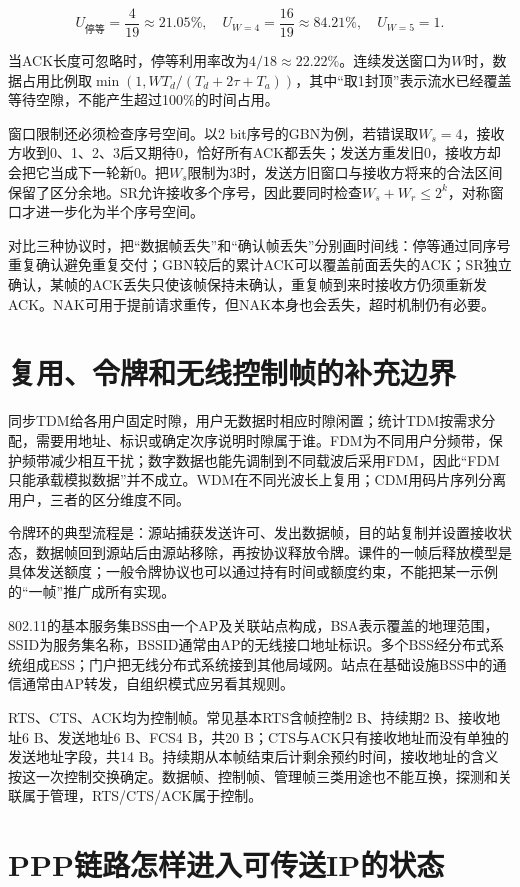 \[U_{\text{停等}}=\frac4{19}\approx21.05\%,\quad U_{W=4}=\frac{16}{19}\approx84.21\%,\quad U_{W=5}=1.\]

当ACK长度可忽略时，停等利用率改为\(4/18\approx22.22\%\)。连续发送窗口为\(W\)时，数据占用比例取\(\min(1,WT_d/(T_d+2\tau+T_a))\)，其中``取1封顶''表示流水已经覆盖等待空隙，不能产生超过100\%的时间占用。

窗口限制还必须检查序号空间。以2 bit序号的GBN为例，若错误取\(W_s=4\)，接收方收到0、1、2、3后又期待0，恰好所有ACK都丢失；发送方重发旧0，接收方却会把它当成下一轮新0。把\(W_s\)限制为3时，发送方旧窗口与接收方将来的合法区间保留了区分余地。SR允许接收多个序号，因此要同时检查\(W_s+W_r\le2^k\)，对称窗口才进一步化为半个序号空间。

对比三种协议时，把``数据帧丢失''和``确认帧丢失''分别画时间线：停等通过同序号重复确认避免重复交付；GBN较后的累计ACK可以覆盖前面丢失的ACK；SR独立确认，某帧的ACK丢失只使该帧保持未确认，重复帧到来时接收方仍须重新发ACK。NAK可用于提前请求重传，但NAK本身也会丢失，超时机制仍有必要。

\section{复用、令牌和无线控制帧的补充边界}\label{CN03-course-mac}

同步TDM给各用户固定时隙，用户无数据时相应时隙闲置；统计TDM按需求分配，需要用地址、标识或确定次序说明时隙属于谁。FDM为不同用户分频带，保护频带减少相互干扰；数字数据也能先调制到不同载波后采用FDM，因此``FDM只能承载模拟数据''并不成立。WDM在不同光波长上复用；CDM用码片序列分离用户，三者的区分维度不同。

令牌环的典型流程是：源站捕获发送许可、发出数据帧，目的站复制并设置接收状态，数据帧回到源站后由源站移除，再按协议释放令牌。课件的一帧后释放模型是具体发送额度；一般令牌协议也可以通过持有时间或额度约束，不能把某一示例的``一帧''推广成所有实现。

802.11的基本服务集BSS由一个AP及关联站点构成，BSA表示覆盖的地理范围，SSID为服务集名称，BSSID通常由AP的无线接口地址标识。多个BSS经分布式系统组成ESS；门户把无线分布式系统接到其他局域网。站点在基础设施BSS中的通信通常由AP转发，自组织模式应另看其规则。

RTS、CTS、ACK均为控制帧。常见基本RTS含帧控制2 B、持续期2 B、接收地址6 B、发送地址6 B、FCS4 B，共20 B；CTS与ACK只有接收地址而没有单独的发送地址字段，共14 B。持续期从本帧结束后计剩余预约时间，接收地址的含义按这一次控制交换确定。数据帧、控制帧、管理帧三类用途也不能互换，探测和关联属于管理，RTS/CTS/ACK属于控制。

\section{PPP链路怎样进入可传送IP的状态}\label{CN03-course-ppp}


